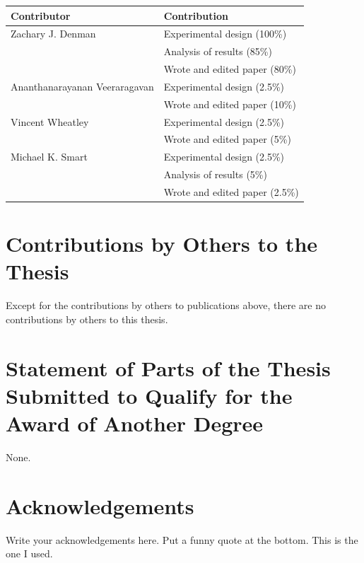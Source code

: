 \begin{center}
  \begin{tabular}{ll}
    \toprule
    Contributor   & Contribution \\
    \midrule
    Zachary J. Denman             & Experimental design (100\%)\\
                                  & Analysis of results (85\%)\\
                                  & Wrote and edited paper (80\%)\\
    \midrule                                  
    Ananthanarayanan Veeraragavan & Experimental design (2.5\%)\\
                                  & Wrote and edited paper (10\%)\\
    \midrule
    Vincent Wheatley              & Experimental design (2.5\%)\\
                                  & Wrote and edited paper (5\%)\\
    \midrule
    Michael K. Smart              & Experimental design (2.5\%)\\
                                  & Analysis of results (5\%)\\
                                  & Wrote and edited paper (2.5\%)\\
    \bottomrule
  \end{tabular}
\end{center}

\section*{Contributions by Others to the Thesis}

Except for the contributions by others to publications above, there are no contributions by others to this thesis.

\section*{Statement of Parts of the Thesis Submitted to Qualify for the Award of Another Degree}

None.

\clearpage

\section*{Acknowledgements} 
  
  Write your acknowledgements here. Put a funny quote at the bottom. This is the one I used.
  \vfill

